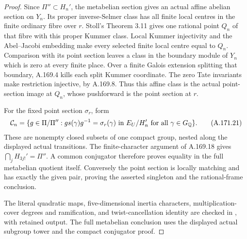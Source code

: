 \begin{proof}
Since \(\Pi''\subset H_n'\), the metabelian section gives
an actual affine abelian section on \(Y_n\).  Its proper
inverse-Selmer class has all finite local centres in the finite
ordinary fibre over \(r\).  Stoll's Theorem 3.11 gives one
rational point \(Q_n\) of that fibre with this proper Kummer
class.  Local Kummer injectivity and the Abel--Jacobi embedding
make every selected finite local centre equal to \(Q_n\).
Comparison with its point section leaves a class in the boundary
module of \(Y_n\) which is zero at every finite place.  Over a
finite Galois extension splitting that boundary, A.169.4 kills
each split Kummer coordinate.  The zero Tate invariants make
restriction injective, by A.169.8.  Thus this affine class is the
actual point-section image at \(Q_n\), whose pushforward is the
point section at \(r\).

For the fixed point section \(\sigma_r\), form
\[
 \mathcal C_n=\{g\in\Pi/\Pi'':
       g s(\gamma)g^{-1}=\sigma_r(\gamma)
       \text{ in }E_U/H_n'\text{ for all }\gamma\in G_\mathbb Q\}.
\tag{A.171.21}
\]
These are nonempty closed subsets of one compact group, nested
along the displayed actual transitions.  The finite-character
argument of A.169.18 gives \(\bigcap_jH_{3j!}'=\Pi''\).
A common conjugator therefore proves equality in the full
metabelian quotient itself.  Conversely the point section is
locally matching and has exactly the given pair, proving the
asserted singleton and the rational-frame conclusion.

The literal quadratic maps, five-dimensional inertia characters,
multiplication-cover degrees and ramification, and twist-cancellation
identity are checked in
, with retained
output.  The full metabelian conclusion uses the displayed actual
subgroup tower and the compact conjugator proof.
\end{proof}
